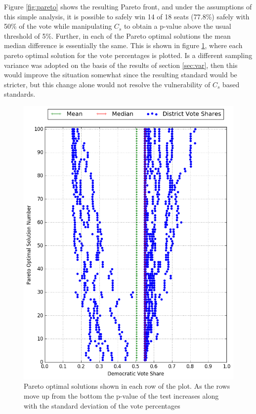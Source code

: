\documentclass[preprint,12pt]{article}
\begin{document}
Figure \ref{fig:pareto} shows the resulting Pareto front, and under the assumptions of this simple analysis, it is possible to safely win 14 of 18 seats (77.8\%) safely with 50\% of the vote while manipulating $C_{s}$ to obtain a p-value above the usual threshold of 5\%.
Further, in each of the Pareto optimal solutions the mean median difference is essentially the same.
This is shown in figure \ref{fig:solutions}, where each pareto optimal solution for the vote percentages is plotted.
Is a different sampling variance was adopted on the basis of the results of section \ref{sec:var}, then this would improve the situation somewhat since the resulting standard would be stricter, but this change alone would not resolve the vulnerability of $C_{s}$ based standards.

\begin{figure}[htb!]
    \begin{center}
        \includegraphics[scale=0.8]{../Figures/SimVsAsymptotic/solutions.png}
        \caption{Pareto optimal solutions shown in each row of the plot. As the rows move up from the bottom the p-value of the test increases along with the standard deviation of the vote percentages}\label{fig:solutions}
    \end{center}
\end{figure}
\end{document}
